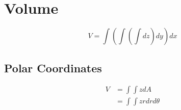 \section{Volume}

  \begin{equation}
    V = \int \left( \int \left( \int dz \right) dy \right) dx
  \end{equation}

  \subsection{Polar Coordinates}

    \begin{align}
      V &= \int \int z dA \\
      &= \int \int z r dr d \theta
    \end{align}